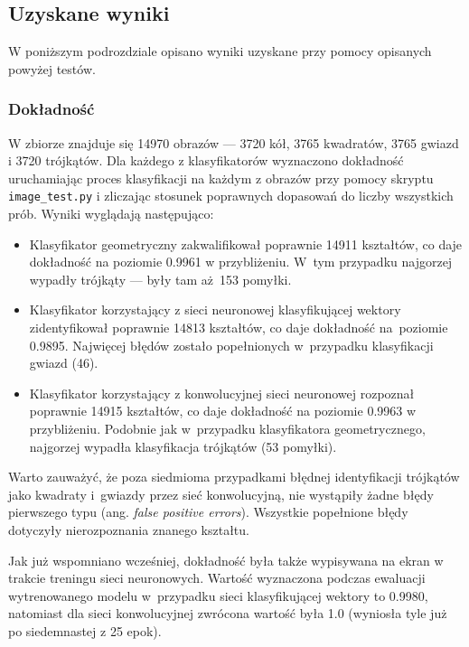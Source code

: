 \documentclass[11pt,a4paper]{article}
\begin{document}
\subsection{Uzyskane wyniki}

W poniższym podrozdziale opisano wyniki uzyskane przy pomocy opisanych powyżej testów.

\subsubsection{Dokładność}

W zbiorze \cite{shapes} znajduje się 14970 obrazów --- 3720 kół, 3765 kwadratów, 3765 gwiazd i 3720 trójkątów. Dla każdego z klasyfikatorów wyznaczono dokładność uruchamiając proces klasyfikacji na każdym z obrazów przy pomocy skryptu \verb+image_test.py+ i zliczając stosunek poprawnych dopasowań do liczby wszystkich prób. Wyniki wyglądają następująco:
\begin{itemize}
    \item Klasyfikator geometryczny zakwalifikował poprawnie 14911 kształtów, co daje dokładność na poziomie 0.9961 w przybliżeniu.
    W~tym przypadku najgorzej wypadły trójkąty --- były tam aż~153 pomyłki.
    \item Klasyfikator korzystający z sieci neuronowej klasyfikującej wektory zidentyfikował poprawnie 14813 kształtów, co daje dokładność na~poziomie 0.9895. Najwięcej błędów zostało popełnionych w~przypadku klasyfikacji gwiazd (46).
    \item Klasyfikator korzystający z konwolucyjnej sieci neuronowej rozpoznał poprawnie 14915 kształtów, co daje dokładność na poziomie 0.9963 w przybliżeniu. Podobnie jak w~przypadku klasyfikatora geometrycznego, najgorzej wypadła klasyfikacja trójkątów (53 pomyłki).
\end{itemize}

Warto zauważyć, że poza siedmioma przypadkami błędnej identyfikacji trójkątów jako kwadraty i~gwiazdy przez sieć konwolucyjną, nie wystąpiły żadne błędy pierwszego typu (ang. \emph{false positive errors}). Wszystkie popełnione błędy dotyczyły nierozpoznania znanego kształtu.

Jak już wspomniano wcześniej, dokładność była także wypisywana na ekran w trakcie treningu sieci neuronowych. Wartość wyznaczona podczas ewaluacji wytrenowanego modelu w~przypadku sieci klasyfikującej wektory to 0.9980, natomiast dla sieci konwolucyjnej zwrócona wartość była 1.0 (wyniosła tyle już po siedemnastej z 25 epok).
\end{document}
